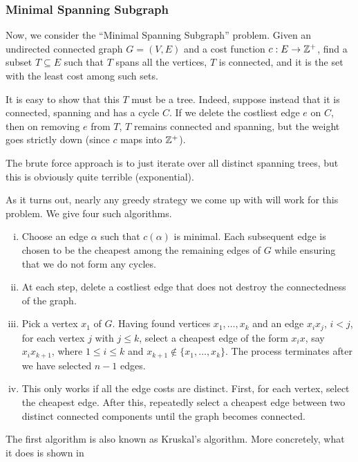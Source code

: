 \subsubsection{Minimal Spanning Subgraph}

Now, we consider the ``Minimal Spanning Subgraph'' problem. Given an undirected connected graph $G=(V,E)$ and a cost function $c:E\to\mathbb{Z}^+$, find a subset $T\subseteq E$ such that $T$ spans all the vertices, $T$ is connected, and it is the set with the least cost among such sets.

It is easy to show that this $T$ must be a tree. Indeed, suppose instead that it is connected, spanning and has a cycle $C$. If we delete the costliest edge $e$ on $C$, then on removing $e$ from $T$, $T$ remains connected and spanning, but the weight goes strictly down (since $c$ maps into $\mathbb{Z}^+$).

The brute force approach is to just iterate over all distinct spanning trees, but this is obviously quite terrible (exponential).

As it turns out, nearly any greedy strategy we come up with will work for this problem. We give four such algorithms.
\begin{enumerate}[(i)]
	\item Choose an edge $\alpha$ such that $c(\alpha)$ is minimal. Each subsequent edge is chosen to be the cheapest among the remaining edges of $G$ while ensuring that we do not form any cycles.
	
	\item At each step, delete a costliest edge that does not destroy the connectedness of the graph.
	
	\item Pick a vertex $x_1$ of $G$. Having found vertices $x_1,\ldots,x_k$ and an edge $x_ix_j$, $i<j$, for each vertex $j$ with $j\leq k$, select a cheapest edge of the form $x_ix$, say $x_i x_{k+1}$, where $1\leq i\leq k$ and $x_{k+1}\not\in\{x_1,\ldots,x_k\}$. The process terminates after we have selected $n-1$ edges.
	
	\item This only works if all the edge costs are distinct. First, for each vertex, select the cheapest edge. After this, repeatedly select a cheapest edge between two distinct connected components until the graph becomes connected.
\end{enumerate}

The first algorithm is also known as Kruskal's algorithm. More concretely, what it does is shown in 

